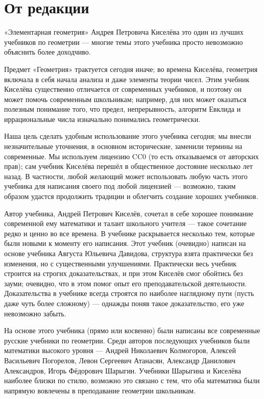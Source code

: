 \section*{От редакции}


«Элементарная геометрия» Андрея Петровича Киселёва это один из лучших учебников по геометрии ---
многие темы этого учебника просто невозможно объяснить более доходчиво.

Предмет «Геометрия» трактуется сегодня иначе;
во времена Киселёва, геометрия включала в себя начала анализа и даже элементы теории чисел.
Этим учебник Киселёва существенно отличается от современных учебников, и поэтому он может помочь современным школьникам;
например, для них может оказаться полезным понимание того, что предел, непрерывность, алгоритм Евклида и иррациональные числа изначально понимались геометрически.

Наша цель сделать удобным использование этого учебника сегодня;
мы внесли незначительные уточнения, в основном исторические, заменили термины на современные. 
Мы используем лицензию CC0 (то есть отказываемся от авторских прав); сам учебник Киселёва перешёл в общественное достояние несколько лет назад.
В частности, любой желающий может использовать любую часть этого учебника для написания своего под любой лицензией ---
возможно, таким образом удастся продолжить традиции и облегчить создание хороших учебников. 

Автор учебника, Андрей Петрович Киселёв, сочетал в себе хорошее понимание современной ему математики и талант школьного учителя --- такое сочетание редко и ценно во все времена.
В учебнике раскрывается несколько тем, которые были новыми к моменту его написания. 
Этот учебник (очевидно) написан на основе учебника Августа Юльевича Давидова, структура взята практически без изменения, но с существенными улучшениями.
Практически весь учебник строится на строгих доказательствах, и при этом Киселёв смог обойтись без зауми;
очевидно, что в этом помог опыт его преподавательской деятельности.
Доказательства в учебнике всегда строятся по наиболее наглядному пути (пусть даже чуть более сложному) --- однажды поняв такое доказательство, его уже невозможно забыть.

На основе этого учебника (прямо или косвенно) были написаны все современные русские учебники по геометрии.
Среди авторов последующих учебников были математики высокого уровня --- Андрей Николаевич Колмогоров, Алексей Васильевич Погорелов, Левон Сергеевич Атанасян,  Александр Данилович Александров, Игорь Фёдорович Шарыгин.
Учебники Шарыгина и Киселёва наиболее близки по стилю, возможно это связано с тем, что оба математика были напрямую вовлечены в преподавание геометрии школьникам.


\clearpage
